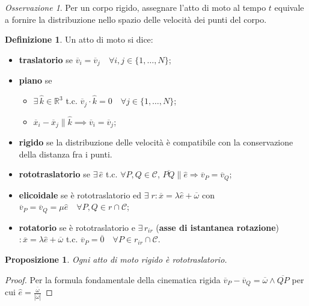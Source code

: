 \documentclass{book}
\theoremstyle{plain}
\theoremstyle{plain}
\theoremstyle{plain}
\theoremstyle{plain}
\theoremstyle{plain}
\newtheorem{prop}{Proposizione}[chapter]
\theoremstyle{definition}
\newtheorem{defi}{Definizione}[chapter]
\theoremstyle{remark}
\newtheorem*{oss}{Osservazione}
\theoremstyle{definition}
\begin{document}
\begin{oss}
    Per un corpo rigido, assegnare l'atto di moto al tempo $t$ equivale a fornire la distribuzione nello spazio delle velocità dei punti del corpo.
\end{oss}

\begin{defi}
    Un atto di moto si dice:
    \begin{itemize}
        \item \textbf{traslatorio} se $\overline{v}_{i}=\overline{v}_{j} \quad \forall i, j \in\{1, \ldots, N\}$;
        \item \textbf{piano} se
         \begin{itemize}
            \item $\exists \, \hat{k} \in \mathbb{R}^{3}$ t.c. $\overline{v}_{j} \cdot \hat{k} = 0 \quad \forall j \in \{1, \ldots, N\}$;
            \item $\overline{x}_i - \overline{x}_j \parallel \hat{k} \implies \overline{v}_{i} = \overline{v}_{j}$;
        \end{itemize}
        \item \textbf{rigido} se la distribuzione delle velocità è compatibile con la conservazione della distanza fra i punti.
        \item \textbf{rototraslatorio} se $\exists \, \hat{e}$ t.c. $\forall P, Q \in \mathcal{C}$, $\overline{PQ} \parallel \hat{e} \Longrightarrow \overline{v}_{P}=\overline{v}_{Q}$;
        \item \textbf{elicoidale} se è rototraslatorio ed $\exists \; r: \overline{x}=\lambda \hat{e} + \overline{\omega}$ con $\overline{v}_{P}=\overline{v}_{Q}=\mu \hat{e} \quad \forall P, Q \in r \cap \mathcal{C}$;
        \item \textbf{rotatorio} se è rototraslatorio e $\exists \, r_{ir}$ (\textbf{asse di istantanea rotazione}) $: \overline{x}=\lambda \hat{e}+\overline{\omega}$ t.c. $\overline{v}_{P}=\overline{0} \quad \forall P \in r_{ir} \cap \mathcal{C}$.
    \end{itemize}
\end{defi}

\begin{prop}
    Ogni atto di moto rigido è rototraslatorio.
\end{prop}

\begin{proof}
    Per la formula fondamentale della cinematica rigida $\overline{v}_P-\overline{v}_Q=\overline{\omega}\wedge\overline{QP}$ per cui $\hat{e}=\frac{\overline{\omega}}{|\overline{\omega}|}$
\end{proof}
\end{document}

